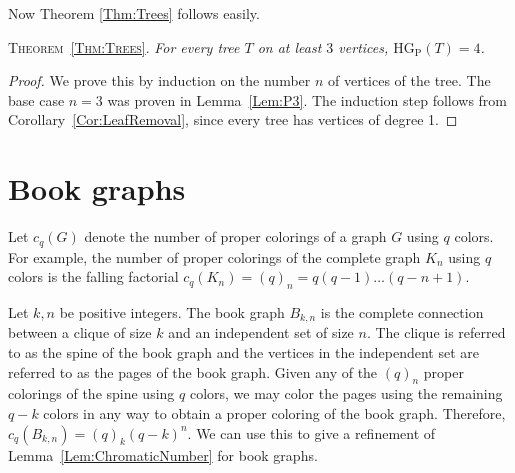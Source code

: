 \documentclass[a4paper,11pt]{amsproc}
\theoremstyle{plain}
\theoremstyle{definition}
\newcommand{\HGP}{\mathrm{HG_{P}}}
\begin{document}
Now Theorem \ref{Thm:Trees} follows easily.
\newline

{\scshape Theorem~\ref{Thm:Trees}.}
 {\it For every tree $T$ on at least $3$ vertices, $\HGP(T) = 4$.}
\begin{proof}
 We prove this by induction on the number $n$ of vertices of the tree.
 The base case $n=3$ was proven in Lemma~\ref{Lem:P3}.
 The induction step follows from Corollary~\ref{Cor:LeafRemoval}, since every tree has vertices of degree 1.
\end{proof}

\setcounter{section}{4}

\section{Book graphs}
\label{sec:book_graphs}

Let $c_q(G)$ denote the number of proper colorings of a graph $G$ using $q$ colors. For example, the number of proper colorings of the complete graph $K_n$ using $q$ colors is the falling factorial $c_q(K_n) = (q)_n = q(q-1)\dots(q-n+1)$.

Let $k,n$ be positive integers. The book graph $B_{k,n}$ is the complete connection between a clique of size $k$ and an independent set of size $n$. The clique is referred to as the spine of the book graph and the vertices in the independent set are referred to as the pages of the book graph. Given any of the $(q)_n$ proper colorings of the spine using $q$ colors, we may color the pages using the remaining $q-k$ colors in any way to obtain a proper coloring of the book graph. Therefore, $c_q(B_{k,n}) = (q)_k(q-k)^n$. 
We can use this to give a refinement of Lemma~\ref{Lem:ChromaticNumber} for book graphs.
\end{document}
